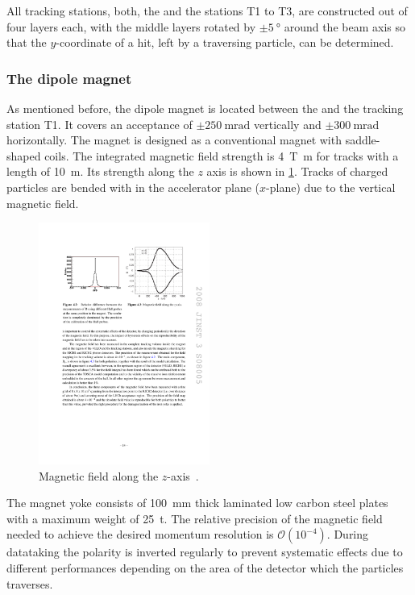 All tracking stations, \ie both, the \ttracker and the stations T1 to T3, are constructed out of four layers each, with the middle layers rotated by $\pm\SI{5}{\degree}$ around the beam axis so that the $y$-coordinate of a hit, left by a traversing particle, can be determined.

\subsubsection*{The dipole magnet}
\label{sec:magnet}

As mentioned before, the dipole magnet is located between the \ttracker and the tracking station T1.
It covers an acceptance of $\pm\SI{250}{\milli\radian}$ vertically and $\pm\SI{300}{\milli\radian}$ horizontally.
The magnet is designed as a conventional magnet with saddle-shaped coils.
The integrated magnetic field strength is \SI{4}{\tesla\metre} for tracks with a length of \SI{10}{\metre}.
Its strength along the $z$ axis is shown in \cref{fig:MagField}.
Tracks of charged particles are bended with in the accelerator plane ($x$-plane) due to the vertical magnetic field.
\begin{figure}[tbp]
    \centering
    \includegraphics[width=0.5\textwidth]{05lhcb/figs/magnetField.pdf}
    \caption{Magnetic field along the $z$-axis~\cite{Alves:2008zz}.}
    \label{fig:MagField}
\end{figure}
The magnet yoke consists of \SI{100}{\milli\metre} thick laminated low carbon steel plates with a maximum weight of \SI{25}{\tonne}.
The relative precision of the magnetic field needed to achieve the desired momentum resolution is $\mathcal{O}\!\left(10^{-4}\right)$.
During datataking the polarity is inverted regularly to prevent systematic effects due to \eg different performances depending on the area of the detector which the particles traverses.

